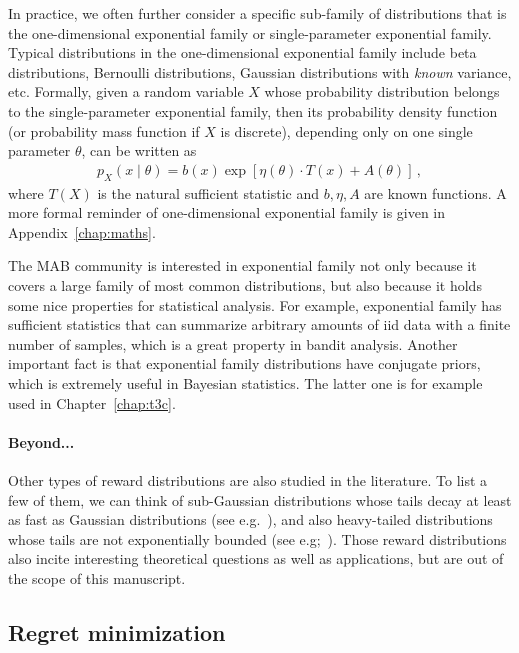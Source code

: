 In practice, we often further consider a specific sub-family of distributions that is the \gls{one-dimensional exponential family} or \gls{single-parameter exponential family}. Typical distributions in the one-dimensional exponential family include beta distributions, Bernoulli distributions, Gaussian distributions with \emph{known} variance, etc. Formally, given a random variable $X$ whose probability distribution belongs to the single-parameter exponential family, then its \gls{probability density function} (or \gls{probability mass function} if $X$ is discrete), depending only on one single parameter $\theta$, can be written as
\begin{align}\label{eq:mab.exponential}
    p_{X}(x \mid \theta ) = b(x) \exp \left[\eta (\theta ) \cdot T(x) + A(\theta )\right]\,,
\end{align}
where $T(X)$ is the \gls{natural sufficient statistic} and $b,\eta,A$ are known functions. A more formal reminder of one-dimensional exponential family is given in Appendix~\ref{chap:maths}.

The MAB community is interested in exponential family not only because it covers a large family of most common distributions, but also because it holds some nice properties for statistical analysis. For example, exponential family has sufficient statistics that can summarize arbitrary amounts of \gls{iid} data with a finite number of samples, which is a great property in bandit analysis. Another important fact is that exponential family distributions have conjugate priors, which is extremely useful in Bayesian statistics. The latter one is for example used in Chapter~\ref{chap:t3c}.

\paragraph{Beyond...}

Other types of reward distributions are also studied in the literature. To list a few of them, we can think of sub-Gaussian distributions whose tails decay at least as fast as Gaussian distributions (see e.g.~\citealt{}), and also heavy-tailed distributions whose tails are not exponentially bounded (see e.g;~\citealt{yu2018heavy}). Those reward distributions also incite interesting theoretical questions as well as applications, but are out of the scope of this manuscript.

\subsection{Regret minimization}\label{sec:mab.model.regret}

